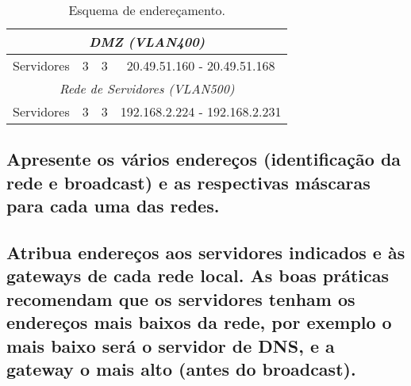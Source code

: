 \documentclass[a4paper,12pt]{article}
\begin{document}
\begin{table}[h]
\begin{tabular}{ l | c | c | c }
			\multicolumn{4}{c}{\textit{DMZ (VLAN400)}} \\\hline
			Servidores & 3 & 3 & 20.49.51.160 - 20.49.51.168 \\\hline
			
			\multicolumn{4}{c}{\textit{Rede de Servidores (VLAN500)}} \\\hline
			Servidores & 3 & 3 & 192.168.2.224 - 192.168.2.231 \\\hline
			\bottomrule
			
			\end{tabular}
			\caption{Esquema de endereçamento.}
			\label{tab:enderecamento_esquema}
			\end{table}

			\subsection{Apresente os vários endereços (identificação da rede e broadcast) e as respectivas máscaras para cada uma das redes.}
				\subsection{Atribua endereços aos servidores indicados e às gateways de cada rede local.
					As boas práticas recomendam que os servidores tenham os endereços mais
						baixos da rede, por exemplo o mais baixo será o servidor de DNS, e a gateway
						o mais alto (antes do broadcast).}
\end{document}
